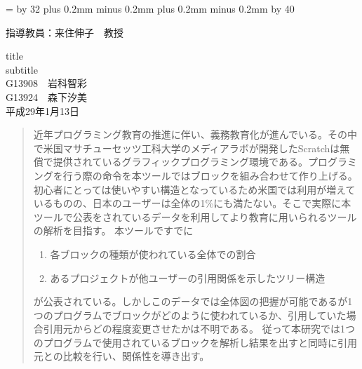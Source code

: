 \documentclass[a4paper,10pt,onecolumn,oneside,openany]{jsbook}
\def\linesparpage#1{\baselineskip=\textheight
   \divide\baselineskip by #1}
\def\kcharparline#1{%
   \ifx\xkanjiskip\undefined%
   \jintercharskip 0mm plus 0.2mm minus 0.2mm
   \else
   \xkanjiskip 0mm plus 0.2mm minus 0.2mm
   \fi
   \settowidth{\textwidth}{あ}%
   \multiply\textwidth by #1}
\begin{document}
\linesparpage{32} %
\kcharparline{40} %
\begin{titlepage}
\begin{flushright}
{\large
指導教員：来住伸子　教授 \\ %
}
\end{flushright}
\begin{center}
\vspace{150truept}
{\huge title}\\ %
\vspace{10truept}
{\Large subtitle}\\ %
\vspace{50truept}
{\huge G13908　岩科智彩}\\ %
\vspace{10truept}
{\huge G13924　森下汐美}\\ %
\vspace{50truept}
{\huge 平成29年1月13日}\\ %
\end{center}
\end{titlepage}

\frontmatter
\begin{abstract} %
近年プログラミング教育の推進に伴い、義務教育化が進んでいる。その中で米国マサチューセッツ工科大学のメディアラボが開発したScratchは無償で提供されているグラフィックプログラミング環境である。プログラミングを行う際の命令を本ツールではブロックを組み合わせて作り上げる。初心者にとっては使いやすい構造となっているため米国では利用が増えているものの、日本のユーザーは全体の1\%にも満たない。そこで実際に本ツールで公表をされているデータを利用してより教育に用いられるツールの解析を目指す。
本ツールですでに
\begin{enumerate}
  \item 各ブロックの種類が使われている全体での割合
  \item あるプロジェクトが他ユーザーの引用関係を示したツリー構造
\end{enumerate}
が公表されている。しかしこのデータでは全体図の把握が可能であるが1つのプログラムでブロックがどのように使われているか、引用していた場合引用元からどの程度変更させたかは不明である。
従って本研究では1つのプログラムで使用されているブロックを解析し結果を出すと同時に引用元との比較を行い、関係性を導き出す。
\end{abstract}

\tableofcontents
%
%
\mainmatter
%
\end{document}

